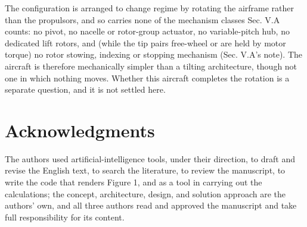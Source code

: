 \documentclass[journal]{new-aiaa}
\begin{document}
The configuration is arranged to change regime by rotating the airframe rather than the propulsors, and so carries none of the mechanism classes Sec. V.A counts: no pivot, no nacelle or rotor-group actuator, no variable-pitch hub, no dedicated lift rotors, and (while the tip pairs free-wheel or are held by motor torque) no rotor stowing, indexing or stopping mechanism (Sec. V.A's note). The aircraft is therefore mechanically simpler than a tilting architecture, though not one in which nothing moves. Whether this aircraft completes the rotation is a separate question, and it is not settled here.



\section*{Acknowledgments}

The authors used artificial-intelligence tools, under their direction, to draft and revise the English text, to search the literature, to review the manuscript, to write the code that renders Figure 1, and as a tool in carrying out the calculations; the concept, architecture, design, and solution approach are the authors' own, and all three authors read and approved the manuscript and take full responsibility for its content.
\end{document}
